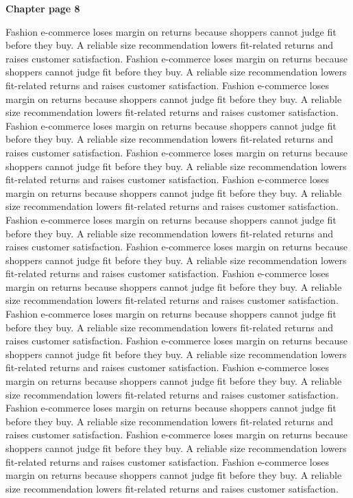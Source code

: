 \documentclass[a4paper,11pt]{article}
\begin{document}
{\headfont\bfseries\Large Chapter page 8}\par\medskip
Fashion e-commerce loses margin on returns because shoppers cannot judge fit before they buy. A reliable size recommendation lowers fit-related returns and raises customer satisfaction. Fashion e-commerce loses margin on returns because shoppers cannot judge fit before they buy. A reliable size recommendation lowers fit-related returns and raises customer satisfaction. Fashion e-commerce loses margin on returns because shoppers cannot judge fit before they buy. A reliable size recommendation lowers fit-related returns and raises customer satisfaction. Fashion e-commerce loses margin on returns because shoppers cannot judge fit before they buy. A reliable size recommendation lowers fit-related returns and raises customer satisfaction. Fashion e-commerce loses margin on returns because shoppers cannot judge fit before they buy. A reliable size recommendation lowers fit-related returns and raises customer satisfaction. 
Fashion e-commerce loses margin on returns because shoppers cannot judge fit before they buy. A reliable size recommendation lowers fit-related returns and raises customer satisfaction. Fashion e-commerce loses margin on returns because shoppers cannot judge fit before they buy. A reliable size recommendation lowers fit-related returns and raises customer satisfaction. Fashion e-commerce loses margin on returns because shoppers cannot judge fit before they buy. A reliable size recommendation lowers fit-related returns and raises customer satisfaction. Fashion e-commerce loses margin on returns because shoppers cannot judge fit before they buy. A reliable size recommendation lowers fit-related returns and raises customer satisfaction. Fashion e-commerce loses margin on returns because shoppers cannot judge fit before they buy. A reliable size recommendation lowers fit-related returns and raises customer satisfaction. 
Fashion e-commerce loses margin on returns because shoppers cannot judge fit before they buy. A reliable size recommendation lowers fit-related returns and raises customer satisfaction. Fashion e-commerce loses margin on returns because shoppers cannot judge fit before they buy. A reliable size recommendation lowers fit-related returns and raises customer satisfaction. Fashion e-commerce loses margin on returns because shoppers cannot judge fit before they buy. A reliable size recommendation lowers fit-related returns and raises customer satisfaction. Fashion e-commerce loses margin on returns because shoppers cannot judge fit before they buy. A reliable size recommendation lowers fit-related returns and raises customer satisfaction. Fashion e-commerce loses margin on returns because shoppers cannot judge fit before they buy. A reliable size recommendation lowers fit-related returns and raises customer satisfaction. \newpage
\end{document}
